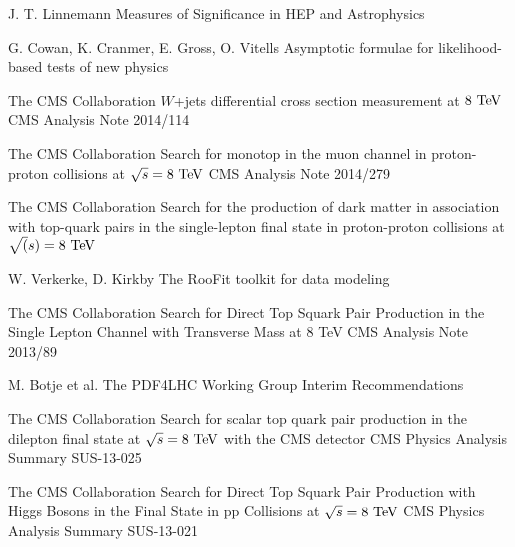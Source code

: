 \begin{thebibliography}{2}
             {J. T. Linnemann}
             {Measures of Significance in HEP and Astrophysics}
             {}

             {G. Cowan, K. Cranmer, E. Gross, O. Vitells}
             {Asymptotic formulae for likelihood-based tests of new physics}
             {}


             {The CMS Collaboration}
             {$W$+jets differential cross section measurement at $8~\text{TeV}$}
             {CMS Analysis Note 2014/114}

             {The CMS Collaboration}
             {Search for monotop in the muon channel in proton-proton collisions at $\sqrt{s} = 8~\text{TeV}$}
             {CMS Analysis Note 2014/279}

             {The CMS Collaboration}
             {Search for the production of dark matter in association with top-quark pairs
             in the single-lepton final state in proton-proton collisions at $\sqrt(s) = 8~\text{TeV}$}
             {}

             {W. Verkerke, D. Kirkby}
             {The RooFit toolkit for data modeling}
             {}


             {The CMS Collaboration}
             {Search for Direct Top Squark Pair Production in the Single Lepton Channel
             with Transverse Mass at 8 TeV}
             {CMS Analysis Note 2013/89}

             {M. Botje et al.}
             {The PDF4LHC Working Group Interim Recommendations}
             {}


             {The CMS Collaboration}
             {Search for scalar top quark pair production in the dilepton
             final state at $\sqrt{s} = 8~\text{TeV}$ with the CMS detector}
             {CMS Physics Analysis Summary SUS-13-025}

             {The CMS Collaboration}
             {Search for Direct Top Squark Pair Production with Higgs Bosons in the Final
             State in pp Collisions at $\sqrt{s} = 8~\text{TeV}$}
             {CMS Physics Analysis Summary SUS-13-021}


\end{thebibliography}
